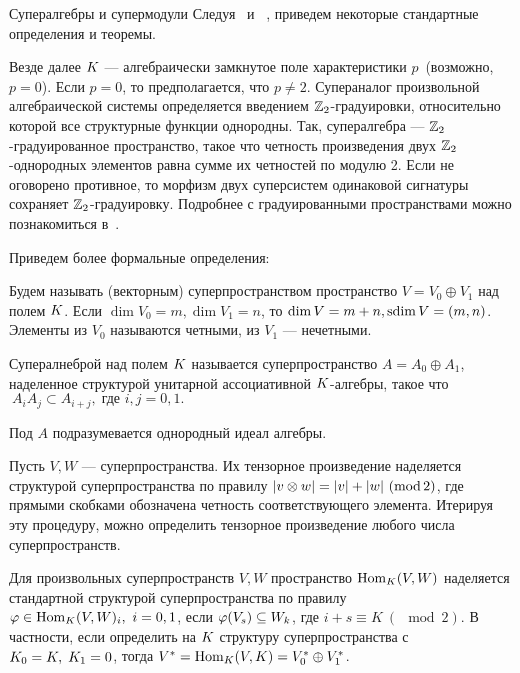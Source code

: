 \begin{subsection}{Супералгебры и супермодули}\label{superalgebras}
  Следуя~\cite{kleshchev} и ~\cite{some_properties_supergroups},
  приведем некоторые стандартные определения и теоремы.
  \newline

  Везде далее $ K $ --- алгебраически замкнутое поле характеристики
  $ p $~(возможно, $ p = 0 $). Если $ p = 0 $, то предполагается, что $ p \neq 2 $.
  Супераналог произвольной алгебраической системы определяется введением
  $\mathbb{Z}_2$-градуировки, относительно которой все структурные функции однородны.
  Так, супералгебра --- $\mathbb{Z}_2$-градуированное пространство, такое что
  четность произведения двух $\mathbb{Z}_2$-однородных элементов равна сумме их четностей
  по модулю 2. Если не оговорено противное, то морфизм двух суперсистем
  одинаковой сигнатуры сохраняет $\mathbb{Z}_2$-градуировку. Подробнее с градуированными
  пространствами можно познакомиться в~\cite{arjantsev}.

  Приведем более формальные определения:
  \begin{definition}
    Будем называть (векторным) суперпространством пространство $ V = V_0 \oplus V_1 $
    над полем $ K $. Если $ \dim V_0 = m, \dim V_1 = n $, то $ \dim V = m + n,
    \mathrm{sdim\,} V = (m, n) $. Элементы из $ V_0 $ называются четными, из $ V_1 $ --- нечетными.
  \end{definition}
  \begin{definition}
    Супералнеброй над полем $ K $ называется суперпространство 
    $ A = A_0 \oplus A_1 $, наделенное структурой унитарной ассоциативной
    $K$-алгебры, такое что $ ~A_i A_j \subset A_{i+j}, \;\text{где } i, j = 0, 1. $
  \end{definition}
  Под  $ A $ подразумевается однородный идеал алгебры.

  Пусть $ V, W $ --- суперпространства. Их тензорное произведение
  наделяется структурой суперпространства по правилу $ |v \otimes w| = |v| + |w| ~(\mathrm{mod}\, 2) $,
  где прямыми скобками обозначена четность соответствующего элемента. Итерируя
  эту процедуру, можно определить тензорное произведение любого числа суперпространств.

  Для произвольных суперпространств $ V, W $ пространство $ \mathrm{Hom}_{K}(V, W) $
  наделяется стандартной структурой суперпространства по правилу
  $ \varphi \in \mathrm{Hom}_{K}(V, W)_i,~i = 0, 1 $, если $ \varphi(V_s) \subseteq W_k $, где
  $ i + s \equiv K~(\mod 2) $. В частности, если определить на $ K $ структуру
  суперпространства с $ K_0 = K, \;K_1 = 0 $, тогда
  $ V^* = \mathrm{Hom}_{K}(V, K) = V_0^* \oplus V_1^* $.


\end{subsection}
